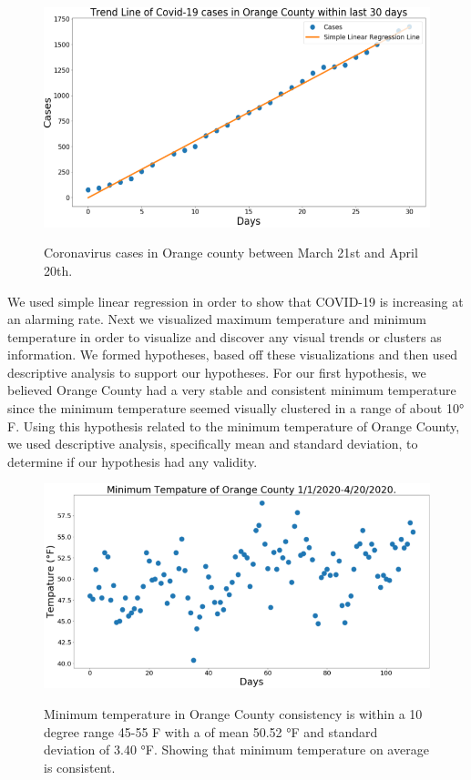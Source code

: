 \documentclass[10pt,journal,compsoc]{IEEEtran}
\begin{document}
{{\begin{figure}[!htbp] %
	\includegraphics[scale=0.45]{covid-orange.png}\\ 
	\centering
	\caption{Coronavirus cases in Orange county between March 21st and April 20th. }
	\label{LP-COVID-Orange County}
\end{figure}

	We used simple linear regression in order to show that COVID-19 is increasing at an alarming rate. Next we visualized maximum temperature and minimum temperature in order to visualize and discover any visual trends or clusters as information. We formed hypotheses, based off these visualizations and then used descriptive analysis to support our hypotheses. For our first hypothesis, we believed Orange County had a very stable and consistent minimum temperature since the minimum temperature seemed visually clustered in a range of about 10° F. Using this hypothesis related to the minimum temperature of Orange County, we used descriptive analysis, specifically mean and standard deviation, to determine if our hypothesis had any validity. 
\newline

 \begin{figure}[!htbp] %
	\includegraphics[scale=0.45]{min-orange.png}\\ 
	\centering
	\caption{Minimum temperature in Orange County consistency is within a 10 degree range 45-55 F with a of mean 50.52 °F  and standard deviation of 3.40 °F. Showing that minimum temperature on average is consistent.
}
	\label{LP-COVID-Minimum Temperature}
\end{figure}

}}
\end{document}
